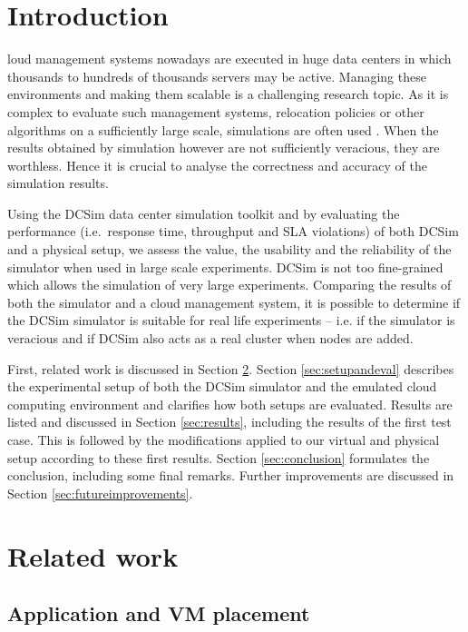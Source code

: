 \documentclass[conference, 10pt]{IEEEtran}
\begin{document}
\section{Introduction}

loud management systems nowadays are executed in huge data centers in which thousands to hundreds of thousands servers may be active. Managing these environments and making them scalable is a challenging research topic. As it is complex to evaluate such management systems, relocation policies or other algorithms on a sufficiently large scale, simulations are often used \cite{simulators}.
When the results obtained by simulation however are not sufficiently veracious, they are worthless. Hence it is crucial to analyse the correctness and accuracy of the simulation results.

Using the DCSim data center simulation toolkit \cite{6380046} and by evaluating the performance (i.e.~response time, throughput and SLA violations) of both DCSim and a physical setup, we assess the value, the usability and the reliability of the simulator when used in large scale experiments. DCSim is not too fine-grained which allows the simulation of very large experiments. Comparing the results of both the simulator and a cloud management system, it is possible to determine if the DCSim simulator is suitable for real life experiments -- i.e. if the simulator is veracious and if DCSim also acts as a real cluster when nodes are added.

First, related work is discussed in Section \ref{sec:relatedwork}. Section \ref{sec:setupandeval} describes the experimental setup of both the DCSim simulator and the emulated cloud computing environment and clarifies how both setups are evaluated. Results are listed and discussed in Section \ref{sec:results}, including the results of the first test case. This is followed by the modifications applied to our virtual and physical setup according to these first results. Section \ref{sec:conclusion} formulates the conclusion, including some final remarks. Further improvements are discussed in Section \ref{sec:futureimprovements}.


\section{Related work}
\label{sec:relatedwork}
\subsection{Application and VM placement}
\end{document}
